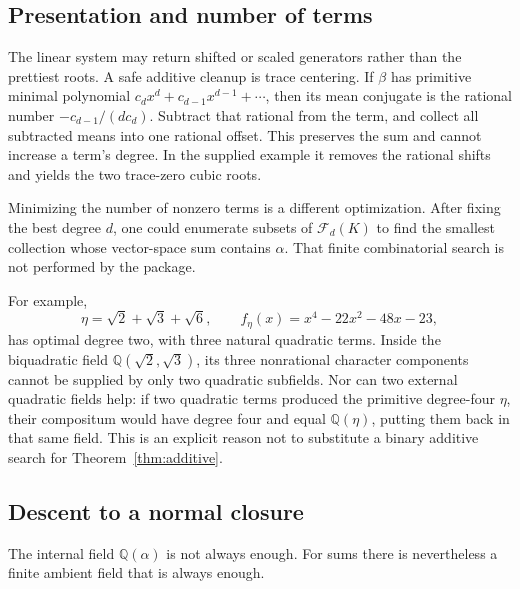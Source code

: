 \documentclass[11pt,letterpaper]{article}
\theoremstyle{definition}
\theoremstyle{remark}
\newcommand{\Q}{\mathbb Q}
\begin{document}
\subsection{Presentation and number of terms}
The linear system may return shifted or scaled generators rather than the
prettiest roots. A safe additive cleanup is trace centering. If \(\beta\)
has primitive minimal polynomial
\(c_dx^d+c_{d-1}x^{d-1}+\cdots\), then its mean conjugate is the rational
number \(-c_{d-1}/(dc_d)\). Subtract that rational from the term, and
collect all subtracted means into one rational offset. This preserves the
sum and cannot increase a term's degree. In the supplied example it removes
the rational shifts and yields the two trace-zero cubic roots.

Minimizing the number of nonzero terms is a different optimization. After
fixing the best degree \(d\), one could enumerate subsets of
\(\mathcal F_d(K)\) to find the smallest collection whose vector-space
sum contains \(\alpha\). That finite combinatorial search is not performed
by the package.

For example,
\begin{equation}
 \eta=\sqrt2+\sqrt3+\sqrt6,\qquad
 f_\eta(x)=x^4-22x^2-48x-23,\label{eq:threeadd}
\end{equation}
has optimal degree two, with three natural quadratic terms. Inside the
biquadratic field \(\Q(\sqrt2,\sqrt3)\), its three nonrational character
components cannot be supplied by only two quadratic subfields. Nor can two
external quadratic fields help: if two quadratic terms produced the
primitive degree-four \(\eta\), their compositum would have degree four
and equal \(\Q(\eta)\), putting them back in that same field. This is
an explicit reason not to substitute a binary additive search for
Theorem~\ref{thm:additive}.

\subsection{Descent to a normal closure}
The internal field \(\Q(\alpha)\) is not always enough. For sums there
is nevertheless a finite ambient field that is always enough.
\end{document}
